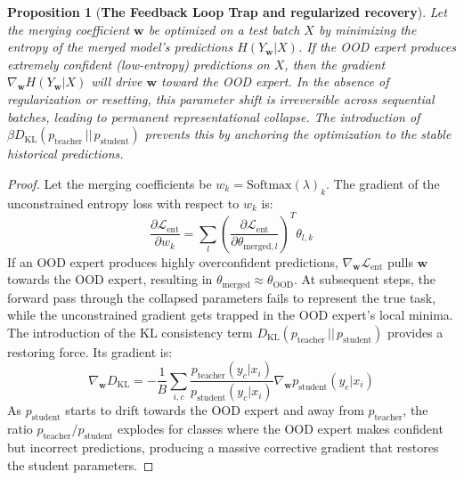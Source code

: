 \documentclass{article}
\theoremstyle{plain}
\newtheorem{proposition}[theorem]{Proposition}
\theoremstyle{definition}
\theoremstyle{remark}
\begin{document}
\begin{proposition}[\textbf{The Feedback Loop Trap and regularized recovery}]
Let the merging coefficient $\mathbf{w}$ be optimized on a test batch $X$ by minimizing the entropy of the merged model's predictions $H(Y_{\mathbf{w}}|X)$. If the OOD expert produces extremely confident (low-entropy) predictions on $X$, then the gradient $\nabla_{\mathbf{w}} H(Y_{\mathbf{w}}|X)$ will drive $\mathbf{w}$ toward the OOD expert. In the absence of regularization or resetting, this parameter shift is irreversible across sequential batches, leading to permanent representational collapse. The introduction of $\beta D_{\text{KL}}\left( p_{\text{teacher}} \,||\, p_{\text{student}} \right)$ prevents this by anchoring the optimization to the stable historical predictions.
\end{proposition}
\begin{proof}
Let the merging coefficients be $w_k = \text{Softmax}(\lambda)_k$. The gradient of the unconstrained entropy loss with respect to $w_k$ is:
\begin{equation*}
    \frac{\partial \mathcal{L}_{\text{ent}}}{\partial w_k} = \sum_{l} \left(\frac{\partial \mathcal{L}_{\text{ent}}}{\partial \theta_{\text{merged}, l}}\right)^T \theta_{l, k}
\end{equation*}
If an OOD expert produces highly overconfident predictions, $\nabla_{\mathbf{w}} \mathcal{L}_{\text{ent}}$ pulls $\mathbf{w}$ towards the OOD expert, resulting in $\theta_{\text{merged}} \approx \theta_{\text{OOD}}$. At subsequent steps, the forward pass through the collapsed parameters fails to represent the true task, while the unconstrained gradient gets trapped in the OOD expert's local minima.
The introduction of the KL consistency term $D_{\text{KL}}(p_{\text{teacher}} \,||\, p_{\text{student}})$ provides a restoring force. Its gradient is:
\begin{equation*}
    \nabla_{\mathbf{w}} D_{\text{KL}} = - \frac{1}{B} \sum_{i, c} \frac{p_{\text{teacher}}(y_c|x_i)}{p_{\text{student}}(y_c|x_i)} \nabla_{\mathbf{w}} p_{\text{student}}(y_c|x_i)
\end{equation*}
As $p_{\text{student}}$ starts to drift towards the OOD expert and away from $p_{\text{teacher}}$, the ratio $p_{\text{teacher}}/p_{\text{student}}$ explodes for classes where the OOD expert makes confident but incorrect predictions, producing a massive corrective gradient that restores the student parameters.
\end{proof}
\end{document}
